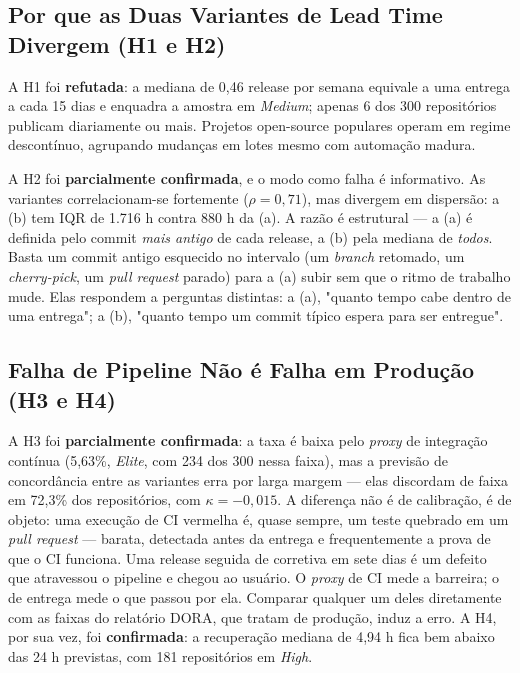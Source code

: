 \subsection{Por que as Duas Variantes de Lead Time Divergem (H1 e H2)}

A H1 foi \textbf{refutada}: a mediana de 0,46 release por semana equivale a uma entrega a
cada 15 dias e enquadra a amostra em \emph{Medium}; apenas 6 dos 300 repositórios publicam
diariamente ou mais. Projetos open-source populares operam em regime descontínuo, agrupando
mudanças em lotes mesmo com automação madura.

A H2 foi \textbf{parcialmente confirmada}, e o modo como falha é informativo. As variantes
correlacionam-se fortemente ($\rho = 0{,}71$), mas divergem em dispersão: a (b) tem IQR de
1.716 h contra 880 h da (a). A razão é estrutural --- a (a) é definida pelo commit \emph{mais
antigo} de cada release, a (b) pela mediana de \emph{todos}. Basta um commit antigo esquecido
no intervalo (um \emph{branch} retomado, um \emph{cherry-pick}, um \emph{pull request}
parado) para a (a) subir sem que o ritmo de trabalho mude. Elas respondem a perguntas
distintas: a (a), "quanto tempo cabe dentro de uma entrega"; a (b), "quanto tempo um commit
típico espera para ser entregue".

\subsection{Falha de Pipeline Não é Falha em Produção (H3 e H4)}

A H3 foi \textbf{parcialmente confirmada}: a taxa é baixa pelo \emph{proxy} de integração contínua (5,63\%,
\emph{Elite}, com 234 dos 300 nessa faixa), mas a previsão de concordância entre as variantes
erra por larga margem --- elas discordam de faixa em 72,3\% dos repositórios, com
$\kappa = -0{,}015$. A diferença não é de calibração, é de objeto: uma execução de CI
vermelha é, quase sempre, um teste quebrado em um \emph{pull request} --- barata, detectada
antes da entrega e frequentemente a prova de que o CI funciona. Uma release seguida de
corretiva em sete dias é um defeito que atravessou o pipeline e chegou ao usuário. O
\emph{proxy} de CI mede a barreira; o de entrega mede o que passou por ela. Comparar qualquer
um deles diretamente com as faixas do relatório DORA, que tratam de produção, induz a erro.
A H4, por sua vez, foi \textbf{confirmada}: a recuperação mediana de 4,94 h fica bem abaixo
das 24 h previstas, com 181 repositórios em \emph{High}.

